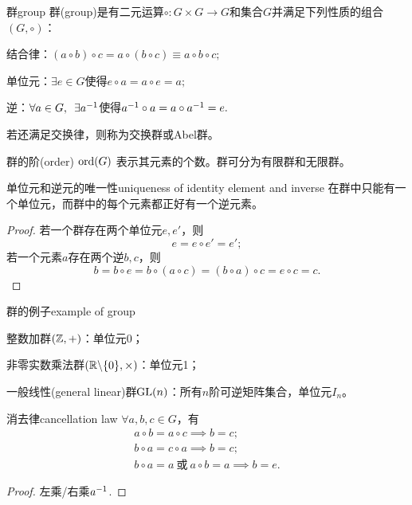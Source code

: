 \begin{definition}{群}{group}
	群(group)是有二元运算$\circ:G\times G\to G$和集合$G$并满足下列性质的组合$(G,\circ)$：
	\begin{compactitem}
		\item 结合律：$(a\circ b)\circ c=a\circ(b\circ c)\equiv a\circ b\circ c;$
		\item 单位元：$\exists e\in G$使得$e\circ a=a\circ e=a;$
		\item 逆：$\forall a\in G,\enspace\exists a^{-1}$使得$a^{-1}\circ a=a\circ a^{-1}=e.$
	\end{compactitem}
	若还满足交换律，则称为交换群或Abel群。

\end{definition}
群的阶(order) $\operatorname{ord}(G)$ 表示其元素的个数。群可分为有限群和无限群。
\begin{theorem}{单位元和逆元的唯一性}{uniqueness of identity element and inverse}
	在群中只能有一个单位元，而群中的每个元素都正好有一个逆元素。
\end{theorem}
\begin{proof}
	若一个群存在两个单位元$e,e'$，则 
	\[
		e=e\circ e'=e';
	\]
	若一个元素$a$存在两个逆$b,c$，则 
	\[
		b=b\circ e=b\circ(a\circ c)=(b\circ a)\circ c=e\circ c=c.
	\]
\end{proof}
\begin{example}{群的例子}{example of group}
	\begin{compactitem}
		\item 整数加群$(\mathbb Z,+)$：单位元0；
		\item 非零实数乘法群$(\mathbb R\backslash\{0\},\times)$：单位元1；
		\item 一般线性(general linear)群$\operatorname{GL}(n)$：所有$n$阶可逆矩阵集合，单位元$I_n$。
	\end{compactitem}
\end{example}
\begin{theorem}{消去律}{cancellation law}
	$\forall a,b,c\in G$，有
	\begin{subequations}
		\begin{gather}
			a\circ b=a\circ c\implies b=c;\\
			b\circ a=c\circ a\implies b=c;\\
			b\circ a=a~\text{或}~a\circ b=a\implies b=e.
		\end{gather}
	\end{subequations}
\end{theorem}
\begin{proof}
	左乘/右乘$a^{-1}$.
\end{proof}
